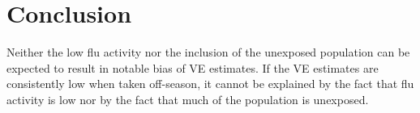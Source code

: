 \documentclass[12pt]{article}
\begin{document}
%
\section{Conclusion}

Neither the low flu activity nor the inclusion of the unexposed population can be expected to result in notable bias of VE estimates. If the VE estimates are consistently low when taken off-season, it cannot be explained by the fact that flu activity is low nor by the fact that much of the population is unexposed.
\end{document}
